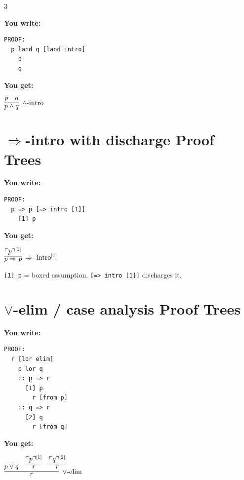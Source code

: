 \documentclass[10pt,landscape,a4paper]{article}
\newenvironment{exwrite}%
  {\par\noindent\scriptsize\textbf{You write:}\par\vspace{0pt}\scriptsize}%
  {\vspace{1pt}}
\newenvironment{exget}%
  {\par\noindent\scriptsize\textbf{You get:}\par\vspace{0pt}\small}%
  {\par\vspace{3pt}}
\begin{document}
\begin{multicols}{3}
\begin{exwrite}%
\begin{verbatim}
PROOF:
  p land q [land intro]
    p
    q
\end{verbatim}
\end{exwrite}
\begin{exget}%
\begin{center}
$\infer[\land\textrm{-intro}]{p \land q}{p & q}$
\end{center}
\end{exget}

\section{$\Rightarrow$-intro with discharge {\normalsize\color{gray}\textrm{\scriptsize Proof Trees}}}

\begin{exwrite}%
\begin{verbatim}
PROOF:
  p => p [=> intro [1]]
    [1] p
\end{verbatim}
\end{exwrite}
\begin{exget}%
\begin{center}
$\infer[\Rightarrow\textrm{-intro}^{[1]}]{p \Rightarrow p}{\ulcorner p \urcorner^{[1]}}$
\end{center}
\end{exget}

{\scriptsize \texttt{[1]~p} = boxed assumption. \texttt{[=> intro~[1]]} discharges it.}

\section{$\lor$-elim / case analysis {\normalsize\color{gray}\textrm{\scriptsize Proof Trees}}}

\begin{exwrite}%
\begin{verbatim}
PROOF:
  r [lor elim]
    p lor q
    :: p => r
      [1] p
        r [from p]
    :: q => r
      [2] q
        r [from q]
\end{verbatim}
\end{exwrite}
\begin{exget}%
\begin{center}
$\infer[\lor\textrm{-elim}]{r}{p \lor q & \infer{r}{\ulcorner p \urcorner^{[1]}} & \infer{r}{\ulcorner q \urcorner^{[2]}}}$
\end{center}
\end{exget}


\end{multicols}
\end{document}
